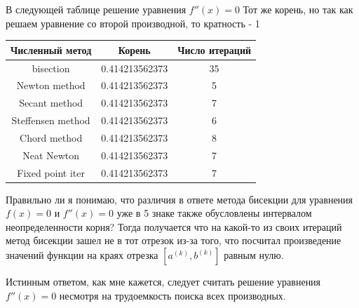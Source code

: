 \documentclass[a4paper,12pt]{report} %
\begin{document}
\vspace{2em}

В следующей таблице решение уравнения $f''(x) = 0$ Тот же корень, но так как решаем уравнение со второй производной, то кратность - 1

\begin{tabular}{| c | c | c |}
	\hline
	Численный метод & Корень & Число итераций \\ \hline
	bisection & 0.414213562373 & 35 \\ \hline
	Newton method & 0.414213562373 & 5 \\ \hline
	Secant method & 0.414213562373 & 7 \\ \hline
	Steffensen method & 0.414213562373 & 6 \\ \hline
	Chord method & 0.414213562373 & 8 \\ \hline
	Neat Newton & 0.414213562373 & 7 \\ \hline
	Fixed point iter & 0.414213562373 & 7 \\ \hline
\end{tabular}

\vspace{2em}
Правильно ли я понимаю, что различия в ответе метода бисекции для уравнения $f(x) = 0$ и $f''(x) = 0$ уже в 5 знаке также обусловлены интервалом неопределенности корня? Тогда получается что на какой-то из своих итераций метод бисекции зашел не в тот отрезок из-за того, что посчитал произведение значений функции на краях отрезка $[a^{(k)}, b^{(k)}]$ равным нулю.

Истинным ответом, как мне кажется, следует считать решение уравнения $f''(x) = 0$ несмотря на трудоемкость поиска всех производных.
\end{document}
